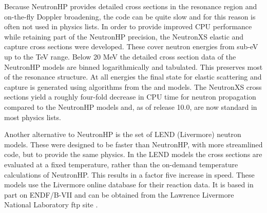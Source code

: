 Because NeutronHP provides detailed cross sections in the resonance region and 
on-the-fly Doppler broadening, the code can be quite slow and for this reason 
is often not used in physics lists.  In order to provide improved CPU 
performance while retaining part of the NeutronHP precision, the NeutronXS 
elastic and capture cross sections were developed.  These cover neutron energies
from sub-eV up to the TeV range.  Below 20 MeV the detailed cross section data 
of the NeutronHP models are binned logarithmically and tabulated.  This preserves
most of the resonance structure.  At all energies the final state for elastic 
scattering and capture is generated using algorithms from the 
 and  models.  The 
NeutronXS cross sections yield a roughly four-fold decrease in CPU time for 
neutron propagation compared to the NeutronHP models and, as of release 10.0,
are now standard in most physics lists.

Another alternative to NeutronHP is the set of LEND (Livermore) neutron models.
These were designed to be faster than NeutronHP, with more streamlined code, but
to provide the same physics.  In the LEND models the cross sections are evaluated 
at a fixed temperature, rather than the on-demand temperature calculations of 
NeutronHP.  This results in a factor five increase in speed.  These models use
the Livermore online database for their reaction data.  It is based in part on 
ENDF/B-VII and can be obtained from the Lawrence Livermore National Laboratory
ftp site \cite{hadbib:llnlftp} .


